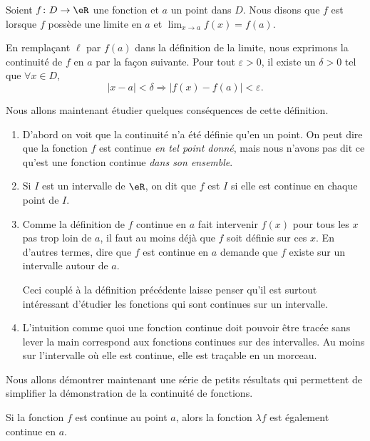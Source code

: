 \begin{definition}		\label{DefFonctContinueRR}
	Soient $f\colon D\to \eR$ une fonction et $a$ un point dans $D$. Nous disons que $f$ est  lorsque $f$ possède une limite en $a$ et $\lim_{x\to a} f(x)=f(a)$.
\end{definition}
En remplaçant $\ell$ par $f(a)$ dans la définition de la limite, nous exprimons la continuité de $f$ en $a$ par la façon suivante. Pour tout $\varepsilon>0$, il existe un $\delta>0$ tel que $\forall x\in D$,
\begin{equation}
	| x-a |<\delta\Rightarrow \big| f(x)-f(a) \big|<\varepsilon.
\end{equation}


Nous allons maintenant étudier quelques conséquences de cette définition. 

\begin{enumerate}
\item D'abord on voit que la continuité n'a été définie qu'en un point. On peut dire que la fonction $f$ est continue \emph{en tel point donné}, mais nous n'avons pas dit ce qu'est une fonction continue \emph{dans son ensemble}.

\item Si $I$ est un intervalle de $\eR$, on dit que $f$ est  $I$ si elle est continue en chaque point de $I$.

\item Comme la définition de $f$ continue en $a$ fait intervenir $f(x)$ pour tous les $x$ pas trop loin de $a$, il faut au moins déjà que $f$ soit définie sur ces $x$. En d'autres termes, dire que $f$ est continue en $a$ demande que $f$ existe sur un intervalle autour de $a$. 

Ceci couplé à la définition précédente laisse penser qu'il est surtout intéressant d'étudier les fonctions qui sont continues sur un intervalle.

\item L'intuition comme quoi une fonction continue doit pouvoir être tracée sans lever la main correspond aux fonctions continues sur des intervalles. Au moins sur l'intervalle où elle est continue, elle est traçable en un morceau.
\end{enumerate}


Nous allons démontrer maintenant une série de petits résultats qui permettent de simplifier la démonstration de la continuité de fonctions.
\begin{theorem}
Si la fonction $f$ est continue au point $a$, alors la fonction $\lambda f$ est également continue en $a$.
\end{theorem}

